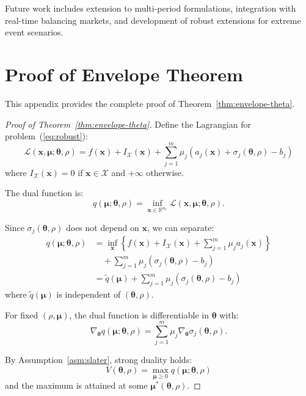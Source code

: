 \documentclass[lettersize,journal]{IEEEtran}
\newcommand{\R}{\mathbb{R}}
\newcommand{\cX}{\mathcal{X}}
\newcommand{\cL}{\mathcal{L}}
\newcommand{\btheta}{\bm{\theta}}
\newcommand{\bmu}{\bm{\mu}}
\newcommand{\bx}{\bm{x}}
\theoremstyle{definition}
\begin{document}
Future work includes extension to multi-period formulations, integration with real-time balancing markets, and development of robust extensions for extreme event scenarios.

\appendices

\section{Proof of Envelope Theorem}
\label{app:envelope-proof}

This appendix provides the complete proof of Theorem~\ref{thm:envelope-theta}.

\begin{proof}[Proof of Theorem~\ref{thm:envelope-theta}]
Define the Lagrangian for problem~(\ref{eq:robust}):
\begin{equation}
\cL(\bx, \bmu; \btheta, \rho) = f(\bx) + I_{\cX}(\bx) + \sum_{j=1}^m \mu_j(a_j(\bx) + \sigma_j(\btheta,\rho) - b_j)
\end{equation}
where $I_{\cX}(\bx) = 0$ if $\bx \in \cX$ and $+\infty$ otherwise.

The dual function is:
\begin{equation}
q(\bmu; \btheta, \rho) = \inf_{\bx \in \R^{n_x}} \cL(\bx, \bmu; \btheta, \rho).
\end{equation}

Since $\sigma_j(\btheta,\rho)$ does not depend on $\bx$, we can separate:
\begin{align}
q(\bmu; \btheta, \rho) &= \inf_{\bx}\left\{f(\bx) + I_{\cX}(\bx) + \sum_{j=1}^m \mu_j a_j(\bx)\right\} \nonumber \\
&\quad + \sum_{j=1}^m \mu_j(\sigma_j(\btheta,\rho) - b_j) \nonumber \\
&= \tilde{q}(\bmu) + \sum_{j=1}^m \mu_j(\sigma_j(\btheta,\rho) - b_j)
\end{align}
where $\tilde{q}(\bmu)$ is independent of $(\btheta, \rho)$.

For fixed $(\rho, \bmu)$, the dual function is differentiable in $\btheta$ with:
\begin{equation}
\nabla_{\btheta} q(\bmu; \btheta, \rho) = \sum_{j=1}^m \mu_j \nabla_{\btheta} \sigma_j(\btheta, \rho).
\end{equation}

By Assumption~\ref{asm:slater}, strong duality holds:
\begin{equation}
V(\btheta, \rho) = \max_{\bmu \geq 0} q(\bmu; \btheta, \rho)
\end{equation}
and the maximum is attained at some $\bmu^*(\btheta, \rho)$.


\end{proof}
\end{document}
